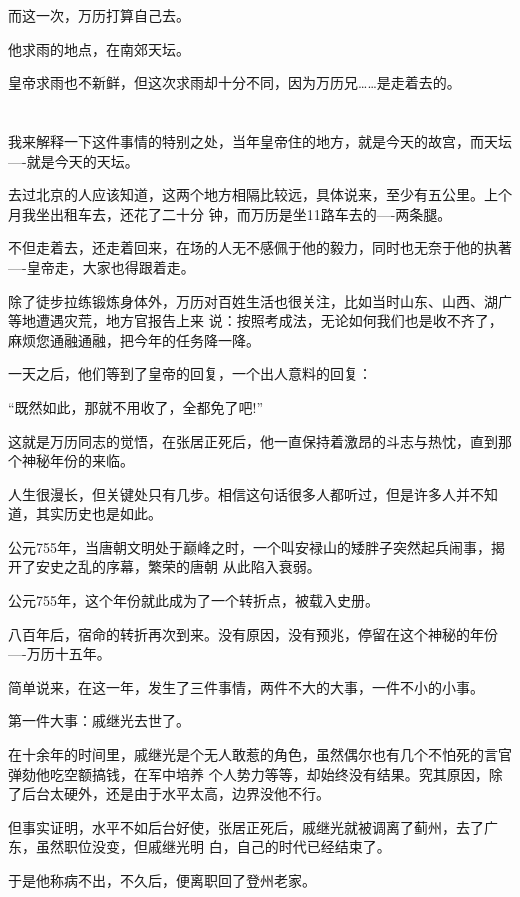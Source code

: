 \documentclass[11pt,a4paper,onecolumn]{article}
\begin{document}
而这一次，万历打算自己去。

他求雨的地点，在南郊天坛。

皇帝求雨也不新鲜，但这次求雨却十分不同，因为万历兄……是走着去的。

\section[\thesection]{}

我来解释一下这件事情的特别之处，当年皇帝住的地方，就是今天的故宫，而天坛----就是今天的天坛。

去过北京的人应该知道，这两个地方相隔比较远，具体说来，至少有五公里。上个月我坐出租车去，还花了二十分
钟，而万历是坐11路车去的----两条腿。

不但走着去，还走着回来，在场的人无不感佩于他的毅力，同时也无奈于他的执著----皇帝走，大家也得跟着走。

除了徒步拉练锻炼身体外，万历对百姓生活也很关注，比如当时山东、山西、湖广等地遭遇灾荒，地方官报告上来
说：按照考成法，无论如何我们也是收不齐了，麻烦您通融通融，把今年的任务降一降。

一天之后，他们等到了皇帝的回复，一个出人意料的回复：

``既然如此，那就不用收了，全都免了吧!''

这就是万历同志的觉悟，在张居正死后，他一直保持着激昂的斗志与热忱，直到那个神秘年份的来临。

人生很漫长，但关键处只有几步。相信这句话很多人都听过，但是许多人并不知道，其实历史也是如此。

公元755年，当唐朝文明处于巅峰之时，一个叫安禄山的矮胖子突然起兵闹事，揭开了安史之乱的序幕，繁荣的唐朝
从此陷入衰弱。

公元755年，这个年份就此成为了一个转折点，被载入史册。

八百年后，宿命的转折再次到来。没有原因，没有预兆，停留在这个神秘的年份----万历十五年。

简单说来，在这一年，发生了三件事情，两件不大的大事，一件不小的小事。

第一件大事：戚继光去世了。

在十余年的时间里，戚继光是个无人敢惹的角色，虽然偶尔也有几个不怕死的言官弹劾他吃空额搞钱，在军中培养
个人势力等等，却始终没有结果。究其原因，除了后台太硬外，还是由于水平太高，边界没他不行。

但事实证明，水平不如后台好使，张居正死后，戚继光就被调离了蓟州，去了广东，虽然职位没变，但戚继光明
白，自己的时代已经结束了。

于是他称病不出，不久后，便离职回了登州老家。
\end{document}
